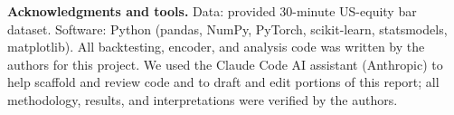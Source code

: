 \documentclass[11pt]{article}
\begin{document}
\vspace{0.5em}
\small
\noindent\textbf{Acknowledgments and tools.} Data: provided 30-minute US-equity bar
dataset. Software: Python (pandas, NumPy, PyTorch, scikit-learn, statsmodels,
matplotlib). All backtesting, encoder, and analysis code was written by the authors for
this project. We used the Claude Code AI assistant (Anthropic) to help scaffold and
review code and to draft and edit portions of this report; all methodology, results,
and interpretations were verified by the authors.
\end{document}
